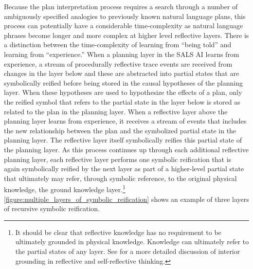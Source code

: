 Because the plan interpretation process requires a search through a
number of ambiguously specified analogies to previously known natural
language plans, this process can potentially have a considerable
time-complexity as natural language phrases become longer and more
complex at higher level reflective layers.  There is a distinction
between the time-complexity of learning from ``being told'' and
learning from ``experience.''  When a planning layer in the SALS AI
learns from experience, a stream of procedurally reflective trace
events are received from changes in the layer below and these are
abstracted into partial states that are symbolically reified before
being stored in the causal hypotheses of the planning layer.  When
these hypotheses are used to hypothesize the effects of a plan, only
the reified symbol that refers to the partial state in the layer below
is stored as related to the plan in the planning layer.  When a
reflective layer above the planning layer learns from experience, it
receives a stream of events that includes the new relationship between
the plan and the symbolized partial state in the planning layer.  The
reflective layer itself symbolically reifies this partial state of the
planning layer.  As this process continues up through each additional
reflective planning layer, each reflective layer performs one symbolic
reification that is again symbolically reified by the next layer as
part of a higher-level partial state that ultimately may refer,
through symbolic reference, to the original physical knowledge, the
ground knowledge layer.\footnote{It should be clear that reflective
  knowledge has no requirement to be ultimately grounded in physical
  knowledge.  Knowledge can ultimately refer to the partial states of
  any layer.  See \cite{minsky:2011} for a more detailed discussion of
  interior grounding in reflective and self-reflective thinking.}
{\mbox{\autoref{figure:multiple_layers_of_symbolic_reification}}}
shows an example of three layers of recursive symbolic reification.
